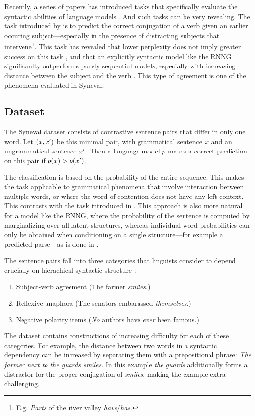 Recently, a series of papers has introduced tasks that specifically evaluate the syntactic abilities of language models \citep{linzen2016syntax,gulordava2018colorless,linzen2018targeted}. And such tasks can be very revealing. The task introduced by \citet{linzen2016syntax} is to predict the correct conjugation of a verb given an earlier occuring subject---especially in the presence of distracting subjects that intervene\footnote{E.g. \textit{Parts} of the river valley \textit{have}/\textit{has}.}. This task has revealed that lower perplexity does not imply greater success on this task \citep{tran2018recurrent}, and that an explicitly syntactic model like the RNNG significanlty outperforms purely sequential models, especially with increasing distance between the subject and the verb \citep{kuncoro2018learn}. This type of agreement is one of the phenomena evaluated in Syneval.

\subsection{Dataset}
  The Syneval dataset consists of contrastive sentence pairs that differ in only one word. Let $(x, x')$ be this minimal pair, with grammatical sentence $x$ and an ungrammatical sentence $x'$. Then a language model $p$ makes a correct prediction on this pair if $p(x) > p(x')$.

  The classification is based on the probability of the entire sequence. This makes the task applicable to grammatical phenomena that involve interaction between multiple words, or where the word of contention does not have any left context. This contrasts with the task introduced in \citet{linzen2016syntax}. This approach is also more natural for a model like the RNNG, where the probability of the sentence is computed by marginalizing over all latent structures, whereas individual word probabilities can only be obtained when conditioning on a single structure---for example a predicted parse---as is done in \cite{kuncoro2018learn}.

  The sentence pairs fall into three categories that linguists consider to depend crucially on hierachical syntactic structure \citep{everaert2015structures,xiang2009illusory}:
    \begin{enumerate}[noitemsep]
      \item Subject-verb agreement (The farmer \textit{smiles}.)
      \item Reflexive anaphora (The senators embarassed \textit{themselves}.)
      \item Negative polarity items (\textit{No} authors have \textit{ever} been famous.)
    \end{enumerate}
  The dataset contains constructions of increasing difficulty for each of these categories. For example, the distance between two words in a syntactic dependency can be increased by separating them with a prepositional phrase: \textit{The farmer next to the guards smiles}. In this example \textit{the guards} additionally forms a distractor for the proper conjugation of \textit{smiles}, making the example extra challenging.

